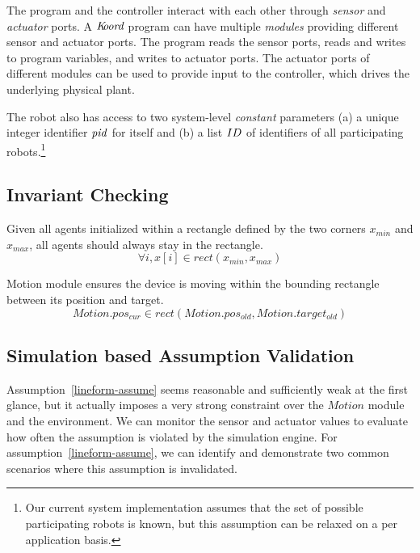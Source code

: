 The program and the controller interact with each other through \emph{sensor} and \emph{actuator} ports.
A $\emph{K\kern-2pt oord}$ program can have multiple \emph{modules} providing different sensor and actuator ports.
The program reads the sensor ports, reads and writes to program variables, and writes to actuator ports.
The actuator ports of different modules can be used to provide input to the controller, which drives the underlying physical plant.


The robot also has access to two system-level \emph{constant} parameters (a) a unique integer identifier $\mathit{pid}$ for itself and (b) a list $ID$ of identifiers of all participating robots.\footnote{Our current system implementation assumes that the set of possible participating robots is known, but this assumption can be relaxed on a per application basis.}


\subsection{Invariant Checking}

\begin{invariant}
    \label{lineform}
Given all agents initialized within a rectangle defined by the two corners $x_{min}$ and $x_{max}$,
all agents should always stay in the rectangle.
\[
\forall i, x[i] \in rect(x_{min}, x_{max})
\]
\end{invariant}


\begin{assumption}\label{lineform-assume}
Motion module ensures the device is moving within the bounding rectangle between its position and target.
\[
Motion.pos_{cur} \in rect(Motion.pos_{old}, Motion.target_{old})
\]
\end{assumption}


\subsection{Simulation based Assumption Validation}

Assumption~\ref{lineform-assume} seems reasonable and sufficiently weak at the first glance,
but it actually imposes a very strong constraint over the $Motion$ module and the environment.
We can monitor the sensor and actuator values to evaluate how often the assumption is violated by the simulation engine.
For assumption~\ref{lineform-assume}, we can identify and demonstrate two common scenarios
where this assumption is invalidated.

